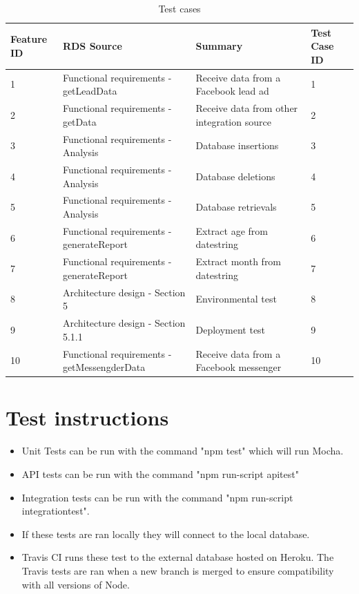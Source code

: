 \documentclass{article}
\begin{document}
\begin{table}[H]
\centering
\caption{Test cases}
\label{test_table}
\begin{tabular}{|l|l|l|l|}
\hline
Feature ID & RDS Source                            & Summary                                    & Test Case ID \\ \hline \hline
1          & Functional requirements - getLeadData & Receive data from a Facebook lead ad       & 1            \\ \hline
2          & Functional requirements - getData     & Receive data from other integration source & 2            \\ \hline
3          & Functional requirements - Analysis    & Database insertions                        & 3            \\ \hline
4          & Functional requirements - Analysis    & Database deletions                         & 4            \\ \hline
5          & Functional requirements - Analysis    & Database retrievals                        & 5            \\ \hline
6          & Functional requirements - generateReport & Extract age from datestring			    & 6			   \\ \hline
7	       & Functional requirements - generateReport & Extract month from datestring			& 7            \\ \hline
8          &  Architecture design - Section 5      & Environmental test                         & 8            \\ \hline
9          &  Architecture design - Section 5.1.1  & Deployment test                            & 9            \\ \hline
10         &  Functional requirements - getMessengderData & Receive data from a Facebook messenger & 10            \\ \hline
\end{tabular}
\end{table}


\section{Test instructions} 
\begin{itemize}
\item Unit Tests can be run with the command "npm test" which will run Mocha.
\item API tests can be run with the command "npm run-script apitest"
\item Integration tests can be run with the command "npm run-script integrationtest".  
\item If these tests are ran locally they will connect to the local database.
\item Travis CI runs these test to the external database hosted on Heroku. The Travis tests are ran when a new branch is merged to ensure compatibility with all versions of Node.
\end{itemize}
\cleardoublepage
\end{document}

